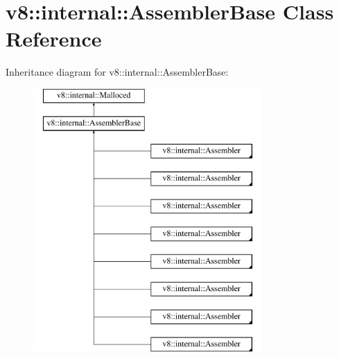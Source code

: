 \hypertarget{classv8_1_1internal_1_1AssemblerBase}{}\section{v8\+:\+:internal\+:\+:Assembler\+Base Class Reference}
\label{classv8_1_1internal_1_1AssemblerBase}
Inheritance diagram for v8\+:\+:internal\+:\+:Assembler\+Base\+:\begin{figure}[H]
\begin{center}
\leavevmode
\includegraphics[height=10.000000cm]{classv8_1_1internal_1_1AssemblerBase}
\end{center}
\end{figure}
